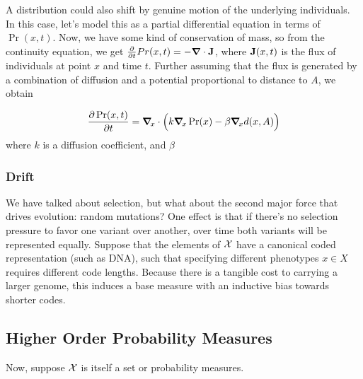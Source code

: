 \documentclass{article}
\begin{document}
A distribution could also shift by genuine motion of the underlying individuals.
In this case, let's model this as a partial differential equation in terms of $\Pr(x,t)$.
Now, we have some kind of conservation of mass, so from the continuity equation, we get
$\frac{\partial }{\partial t}Pr(x,t) = - \boldsymbol\nabla \cdot \mathbf{J}$,
where $\mathbf{J}(x,t)$ is the flux of individuals at point $x$ and time $t$.
Further assuming that the flux is generated by a combination of diffusion and a potential proportional to distance to $A$, we obtain

\[
    \frac{\partial \Pr(x, t)}{\partial t} = \boldsymbol\nabla_{\!x} \cdot \Big( k \boldsymbol\nabla_{\!x} \Pr (x) - \beta \boldsymbol\nabla_{\!x} d(x, A) \Big)
\]
where $k$ is a diffusion coefficient, and $\beta$



\subsubsection{Drift}
We have talked about selection, but what about the second major force that drives evolution: random mutations?
One effect is that if there's no selection pressure to favor one variant over another, over time both variants will be represented equally.
Suppose that the elements of $\mathcal X$ have a canonical coded representation (such as DNA), such that specifying different phenotypes $x \in X$ requires different code lengths.
Because there is a tangible cost to carrying a larger genome, this induces a base measure with an inductive bias towards shorter codes.

%

\subsection{Higher Order Probability Measures}
Now, suppose $\mathcal X$ is itself a set or probability measures.
\end{document}
